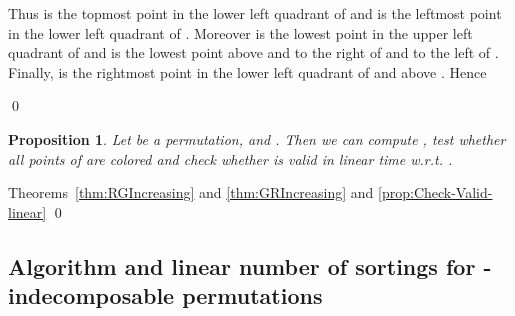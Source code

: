 \documentclass[11pt]{article}
\newenvironment{pf}{{\em \noindent Proof:}}{ \hfill \qed\smallskip}
\newcommand{\Vpoint}[2]{\draw (#1,#2) [darkgreen,fill=darkgreen] circle (3pt);}
\newcommand{\Hpoint}[2]{\draw (#1,#2) [darkred,fill=darkred] circle (3pt);}
\newcommand{\zoneRG}[3]{
\draw [very thick,H,Hpoint] (#1,#2) -- +(-#3,0);
\draw [very thick,V,Vpoint] (#1,#2) -- +(0,#3);
\draw [Hfill] (#1,#2) -- +(-#3,#3) -- +(-#3,0);
\draw [Vfill] (#1,#2) -- +(-#3,#3) -- + (0,#3);
}
\newcommand{\zoneGR}[3]{
\draw [very thick,H,Hpoint] (#1,#2) -- +(-#3,0);
\draw [very thick,V,Vpoint] (#1,#2) -- +(0,#3);
\draw [Vfill] (#1,#2) -- +(-#3,#3) -- +(-#3,0);
\draw [Hfill] (#1,#2) -- +(-#3,#3) -- + (0,#3);
}
\newtheorem{prop}[thm]{Proposition}
\begin{document}
\begin{pf}
\begin{minipage}{.2\textwidth}
\end{minipage}
\begin{minipage}{.75\textwidth}
Thus  is the topmost point in the lower left quadrant of  and 
 is the leftmost point in the lower left quadrant of . 
Moreover  is the lowest point in the upper left quadrant of  and 
 is the lowest point above  and to the right of  and to the left of .
Finally,  is the rightmost point in the lower left quadrant of  and above . 
Hence 
\end{minipage}
\end{pf}

\begin{prop}\label{prop:linearTestC_numero}
Let  be a permutation,  and . 
Then we can compute , test whether all points of  are colored and check whether  is valid
in linear time w.r.t. .
\end{prop}

\begin{pf}
Theorems~\ref{thm:RGIncreasing} and \ref{thm:GRIncreasing} and \ref{prop:Check-Valid-linear}
\end{pf}



\subsection{Algorithm and linear number of sortings for -indecomposable permutations}
\end{document}
